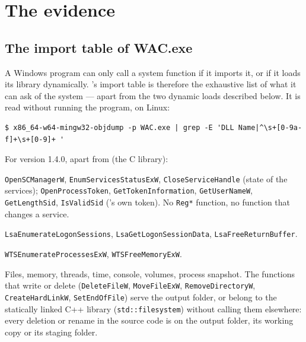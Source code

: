 \documentclass[11pt,a4paper,oneside]{report}
\begin{document}
\chapter{The evidence}\label{ch:preuves}

\section{The import table of WAC.exe}

A Windows program can only call a system function if it imports it, or if it
loads its library dynamically. 's import table is therefore
the exhaustive list of what it can ask of the system — apart from the two
dynamic loads described below. It is read without running the program, on
Linux:

\begin{lstlisting}
$ x86_64-w64-mingw32-objdump -p WAC.exe | grep -E 'DLL Name|^\s+[0-9a-f]+\s+[0-9]+ '
\end{lstlisting}

For version 1.4.0, apart from  (the C library):

\begin{description}[style=nextline,leftmargin=1.2em]
  \item[ADVAPI32.dll] \texttt{OpenSCManagerW}, \texttt{EnumServicesStatusExW},
    \texttt{CloseServiceHandle} (state of the services);
    \texttt{OpenProcessToken}, \texttt{GetTokenInformation},
    \texttt{GetUserNameW}, \texttt{GetLengthSid}, \texttt{IsValidSid}
    (\wac{}'s own token). No \texttt{Reg*} function, no function that changes
    a service.
  \item[Secur32.dll] \texttt{LsaEnumerateLogonSessions},
    \texttt{LsaGetLogonSessionData}, \texttt{LsaFreeReturnBuffer}.
  \item[WTSAPI32.dll] \texttt{WTSEnumerateProcessesExW},
    \texttt{WTSFreeMemoryExW}.
  \item[KERNEL32.dll] Files, memory, threads, time, console, volumes, process
    snapshot. The functions that write or delete (\texttt{DeleteFileW},
    \texttt{MoveFileExW}, \texttt{RemoveDirectoryW}, \texttt{CreateHardLinkW},
    \texttt{SetEndOfFile}) serve the output folder, or belong to the
    statically linked C++ library (\texttt{std::filesystem}) without \wac{}
    calling them elsewhere: every deletion or rename in the source code is on
    the output folder, its working copy or its staging folder.
\end{description}
\end{document}
